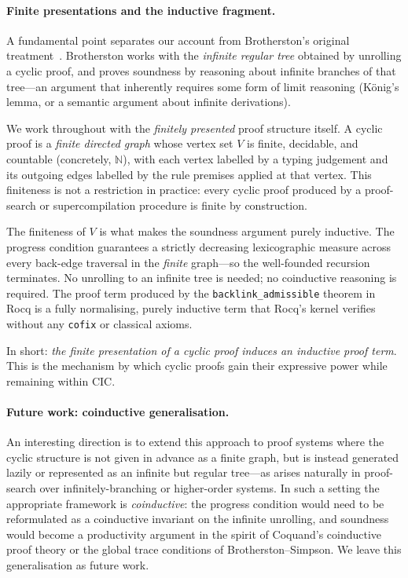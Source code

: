 \documentclass[runningheads]{llncs}
\begin{document}
\paragraph{Finite presentations and the inductive fragment.}

A fundamental point separates our account from Brotherston's original
treatment~\cite{brotherston-2006-cyclic}.  Brotherston works with the
\emph{infinite regular tree} obtained by unrolling a cyclic proof, and proves
soundness by reasoning about infinite branches of that tree---an argument that
inherently requires some form of limit reasoning (K\"{o}nig's lemma, or a
semantic argument about infinite derivations).

We work throughout with the \emph{finitely presented} proof structure itself.
A cyclic proof is a \emph{finite directed graph} whose vertex set $V$ is
finite, decidable, and countable (concretely, $\mathbb{N}$), with each vertex
labelled by a typing judgement and its outgoing edges labelled by the rule
premises applied at that vertex.  This finiteness is not a restriction in
practice: every cyclic proof produced by a proof-search or supercompilation
procedure is finite by construction.

The finiteness of $V$ is what makes the soundness argument purely inductive.
The progress condition guarantees a strictly decreasing lexicographic measure
across every back-edge traversal in the \emph{finite} graph---so the
well-founded recursion terminates.  No unrolling to an infinite tree is
needed; no coinductive reasoning is required.  The proof term produced by
the \texttt{backlink\_admissible} theorem in Rocq is a fully normalising,
purely inductive term that Rocq's kernel verifies without any \texttt{cofix}
or classical axioms.

In short: \emph{the finite presentation of a cyclic proof induces an inductive
proof term}.  This is the mechanism by which cyclic proofs gain their expressive
power while remaining within CIC.

\paragraph{Future work: coinductive generalisation.}
An interesting direction is to extend this approach to proof systems where
the cyclic structure is not given in advance as a finite graph, but is instead
generated lazily or represented as an infinite but regular tree---as arises
naturally in proof-search over infinitely-branching or higher-order systems.
In such a setting the appropriate framework is \emph{coinductive}: the progress
condition would need to be reformulated as a coinductive invariant on the
infinite unrolling, and soundness would become a productivity argument in the
spirit of Coquand's coinductive proof theory or the global trace conditions
of Brotherston--Simpson.  We leave this generalisation as future work.
\end{document}
